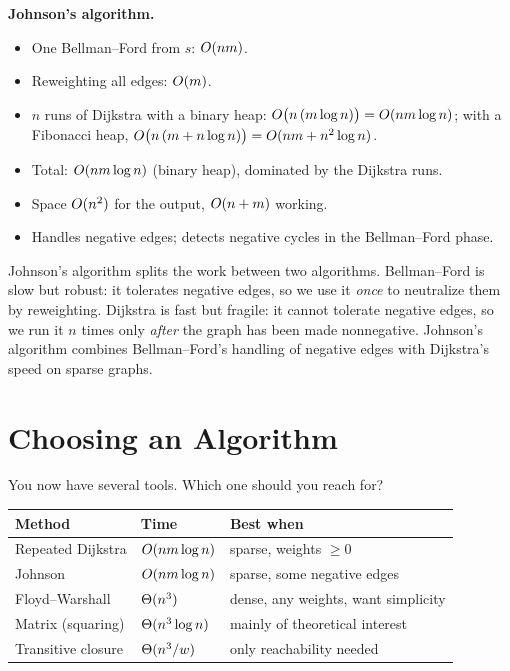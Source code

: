 \begin{complexitybox}
\textbf{Johnson's algorithm.}
\begin{itemize}
\item One Bellman--Ford from $s$: $O(n m)$.
\item Reweighting all edges: $O(m)$.
\item $n$ runs of Dijkstra with a binary heap: $O\big(n\,(m \log n)\big) =
O(n m \log n)$; with a Fibonacci heap, $O\big(n\,(m + n \log n)\big) =
O(n m + n^2 \log n)$.
\item Total: $O(n m \log n)$ (binary heap), dominated by the Dijkstra runs.
\item Space $O(n^2)$ for the output, $O(n + m)$ working.
\item Handles negative edges; detects negative cycles in the Bellman--Ford
phase.
\end{itemize}
\end{complexitybox}

\begin{intuitionbox}
Johnson's algorithm splits the work between two algorithms. Bellman--Ford is slow but robust: it
tolerates negative edges, so we use it \emph{once} to neutralize them by
reweighting. Dijkstra is fast but fragile: it cannot tolerate negative edges,
so we run it $n$ times only \emph{after} the graph has been made nonnegative.
Johnson's algorithm combines Bellman--Ford's handling of negative edges with
Dijkstra's speed on sparse graphs.
\end{intuitionbox}

\section{Choosing an Algorithm}
\label{ch25:choosing}

You now have several tools. Which one should you reach for?

\begin{center}
\begin{tabular}{l l l}
\toprule
Method & Time & Best when \\
\midrule
Repeated Dijkstra & $O(n m \log n)$ & sparse, weights $\ge 0$ \\
Johnson & $O(n m \log n)$ & sparse, some negative edges \\
Floyd--Warshall & $\Theta(n^3)$ & dense, any weights, want simplicity \\
Matrix (squaring) & $\Theta(n^3 \log n)$ & mainly of theoretical interest \\
Transitive closure & $\Theta(n^3 / w)$ & only reachability needed \\
\bottomrule
\end{tabular}
\end{center}

